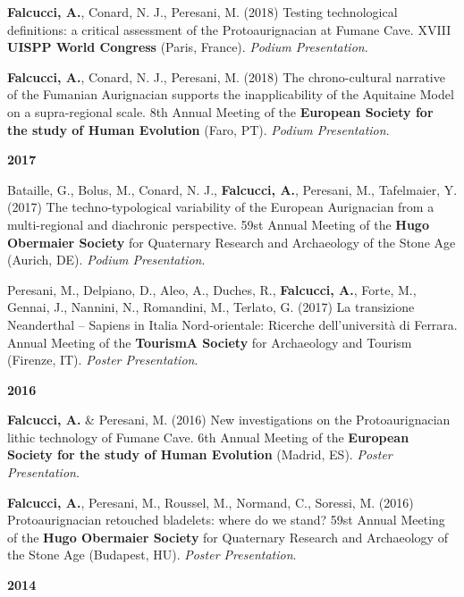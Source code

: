 \documentclass[11pt,a4paper,]{awesome-cv}
\begin{document}
\textbf{Falcucci, A.}, Conard, N. J., Peresani, M. (2018) Testing
technological definitions: a critical assessment of the Protoaurignacian
at Fumane Cave. XVIII \textbf{UISPP World Congress} (Paris, France).
\emph{Podium Presentation}.

\textbf{Falcucci, A.}, Conard, N. J., Peresani, M. (2018) The
chrono-cultural narrative of the Fumanian Aurignacian supports the
inapplicability of the Aquitaine Model on a supra-regional scale. 8th
Annual Meeting of the \textbf{European Society for the study of Human
Evolution} (Faro, PT). \emph{Podium Presentation}.

\setlength{\leftskip}{0cm}

\textbf{2017}

\setlength{\leftskip}{1cm}

Bataille, G., Bolus, M., Conard, N. J., \textbf{Falcucci, A.}, Peresani,
M., Tafelmaier, Y. (2017) The techno-typological variability of the
European Aurignacian from a multi-regional and diachronic perspective.
59st Annual Meeting of the \textbf{Hugo Obermaier Society} for
Quaternary Research and Archaeology of the Stone Age (Aurich, DE).
\emph{Podium Presentation}.

Peresani, M., Delpiano, D., Aleo, A., Duches, R., \textbf{Falcucci, A.},
Forte, M., Gennai, J., Nannini, N., Romandini, M., Terlato, G. (2017) La
transizione Neanderthal -- Sapiens in Italia Nord-orientale: Ricerche
dell'università di Ferrara. Annual Meeting of the \textbf{TourismA
Society} for Archaeology and Tourism (Firenze, IT). \emph{Poster
Presentation}.

\setlength{\leftskip}{0cm}

\textbf{2016}

\setlength{\leftskip}{1cm}

\textbf{Falcucci, A.} \& Peresani, M. (2016) New investigations on the
Protoaurignacian lithic technology of Fumane Cave. 6th Annual Meeting of
the \textbf{European Society for the study of Human Evolution} (Madrid,
ES). \emph{Poster Presentation}.

\textbf{Falcucci, A.}, Peresani, M., Roussel, M., Normand, C., Soressi,
M. (2016) Protoaurignacian retouched bladelets: where do we stand? 59st
Annual Meeting of the \textbf{Hugo Obermaier Society} for Quaternary
Research and Archaeology of the Stone Age (Budapest, HU). \emph{Poster
Presentation}.

\setlength{\leftskip}{0cm}

\textbf{2014}

\setlength{\leftskip}{1cm}
\end{document}
